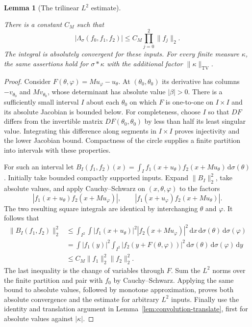 \documentclass[11pt]{amsart}
\newcommand{\dd}{\,\mathrm d}
\DeclareMathOperator{\TV}{TV}
\newtheorem{lemma}[theorem]{Lemma}
\theoremstyle{definition}
\theoremstyle{remark}
\numberwithin{equation}{section}
\providecommand{\lean}[1]{}
\providecommand{\leanok}{}
\begin{document}
\begin{lemma}[The trilinear $L^2$ estimate]\label{lem:triple-l2}
\lean{Auto.lem_triple_l2,Auto.lem_triple_l2_sigma}
\leanok
There is a constant $C_M$ such that
\begin{equation}\label{eq:triple-l2}
 |\Lambda_\sigma(f_0,f_1,f_2)|
     \le C_M\prod_{j=0}^2\|f_j\|_2.
\end{equation}
The integral is absolutely convergent for these inputs.
For every finite measure $\kappa$, the same assertions hold
for $\sigma*\kappa$ with the additional factor
$\|\kappa\|_{\TV}$.
\end{lemma}
\begin{proof}
Consider $F(\theta,\varphi)=Mu_\varphi-u_\theta$.  At
$(\theta_0,\theta_0)$ its derivative has columns
$-v_{\theta_0}$ and $Mv_{\theta_0}$, whose determinant has
absolute value $|\beta|>0$.  There is a sufficiently small
interval $I$ about each $\theta_0$ on which $F$ is one-to-one
on $I\times I$ and its absolute Jacobian is bounded below.
For completeness, choose $I$ so that $DF$ differs from the
invertible matrix $DF(\theta_0,\theta_0)$ by less than half
its least singular value.  Integrating this difference along
segments in $I\times I$ proves injectivity and the lower
Jacobian bound.  Compactness of the circle supplies a finite
partition into intervals with these properties.

For such an interval let
$B_I(f_1,f_2)(x)=\int_I f_1(x+u_\theta)
 f_2(x+Mu_\theta)\dd\sigma(\theta)$.
Initially take bounded compactly supported inputs.  Expand
$\|B_I\|_2^2$, take absolute values, and apply Cauchy--Schwarz
on $(x,\theta,\varphi)$ to the factors
\[
 |f_1(x+u_\theta)f_2(x+Mu_\varphi)|,
 \qquad |f_1(x+u_\varphi)f_2(x+Mu_\theta)|.
\]
The two resulting square integrals are identical by interchanging
$\theta$ and $\varphi$.  It follows that
\begin{align*}
 \|B_I(f_1,f_2)\|_2^2
 &\le\int_{I^2}\int
      |f_1(x+u_\theta)|^2|f_2(x+Mu_\varphi)|^2
                 \dd x\dd\sigma(\theta)\dd\sigma(\varphi)\\
 &=\int |f_1(y)|^2
       \int_{I^2}|f_2(y+F(\theta,\varphi))|^2
                     \dd\sigma(\theta)\dd\sigma(\varphi)\dd y\\
 &\le C_M\|f_1\|_2^2\|f_2\|_2^2.
\end{align*}
The last inequality is the change of variables through $F$.
Sum the $L^2$ norms over the finite partition and pair with
$f_0$ by Cauchy--Schwarz.  Applying the same bound to absolute
values, followed by monotone approximation, proves both absolute
convergence and the estimate for arbitrary $L^2$ inputs.
Finally use the identity and translation argument in
Lemma~\ref{lem:convolution-translate}, first for absolute
values against $|\kappa|$.
\end{proof}
\end{document}
